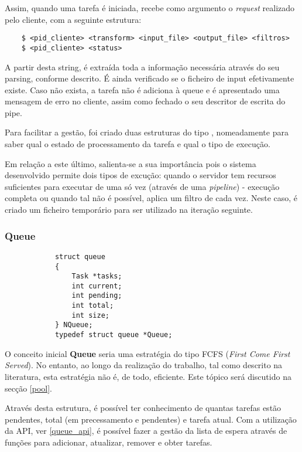 \documentclass[11pt]{article}
\begin{document}
Assim, quando uma tarefa é iniciada, recebe como argumento o \textit{request} realizado pelo cliente, com a
seguinte estrutura:
\begin{verbatim}
    $ <pid_cliente> <transform> <input_file> <output_file> <filtros>
    $ <pid_cliente> <status>
\end{verbatim}

A partir desta string, é extraída toda a informação necessária através do seu parsing, conforme descrito.
É ainda verificado se o ficheiro de input efetivamente existe. Caso não exista, a tarefa não é adiciona à queue
e é apresentado uma mensagem de erro no cliente, assim como fechado o seu descritor de escrita do pipe.

Para facilitar a gestão, foi criado duas estruturas do tipo , nomeadamente para saber qual o estado de processamento
da tarefa e qual o tipo de execução.

Em relação a este último, salienta-se a sua importância pois o sistema desenvolvido permite dois tipos de excução: quando
o servidor tem recursos suficientes para executar de uma só vez (através de uma \textit{pipeline}) - execução completa
ou quando tal não é possível, aplica um filtro de cada vez. Neste caso, é criado um ficheiro temporário para ser utilizado
na iteração seguinte.

\subsubsection{Queue} \label{queue}

\begin{verbatim}
            struct queue
            {
                Task *tasks;
                int current;
                int pending;
                int total;
                int size;
            } NQueue;
            typedef struct queue *Queue;
\end{verbatim}

O conceito inicial \textbf{Queue} seria uma estratégia do tipo FCFS (\textit{First Come First Served}).
No entanto, ao longo da realização do trabalho, tal como descrito na literatura, esta estratégia não é, de todo, eficiente.
Este tópico será discutido na secção \ref{pool}.

Através desta estrutura, é possível ter conhecimento de quantas tarefas estão pendentes, total (em precessamento e pendentes) e
tarefa atual. Com a utilização da API, ver \ref{queue_api}, é possível fazer a gestão da lista de espera através de funções
para adicionar, atualizar, remover e obter tarefas.
\end{document}
